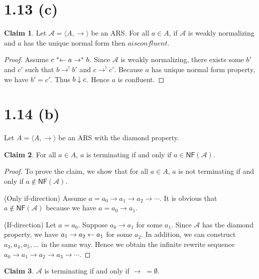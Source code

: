 \documentclass[autodetect-enginem]{article}
\theoremstyle{plain}
\theoremstyle{definition}
\newtheorem*{claim*}{Claim}
\newcommand{\lto}{\reflectbox{$\rightarrow^*$}}
\begin{document}
\section*{1.13 (c)}

\begin{claim*}
    Let $\mathcal{A} = \langle A, \to \rangle$ be an ARS.
    For all $a \in A$, if $\mathcal{A}$ is weakly normalizing and $a$ has the unique normal form then $a is confluent$.
\end{claim*}

\begin{proof}
    Assume $c \;\lto\; a \to^* b$. Since $\mathcal{A}$ is weakly normalizing, there exists some
    $b'$ and $c'$ such that $b \to^! b'$ and $c \to^! c'$.
    Because $a$ has unique normal form property, we have $b' = c'$.
    Thus $b \downarrow c$. Hence $a$ is confluent.    
\end{proof}

\section*{1.14 (b)}
Let $A = \langle A, \to \rangle$ be an ARS with the diamond property.

\begin{claim*}
    For all $a \in A$, $a$ is terminating if and only if $a \in \mathsf{NF}(\mathcal{A})$.
\end{claim*}

\begin{proof}
    To prove the claim, we show that for all $a \in A$, $a$ is not terminating if and only if $a \notin \mathsf{NF}(\mathcal{A})$.

    (Only if-direction) Assume $a = a_0 \to a_1 \to a_2 \to \cdots$.
    It is obvious that $a \notin \mathsf{NF}(\mathcal{A})$ because we have $a = a_0 \to a_1$.
    
    (If-direction) Let $a = a_0$. Suppose $a_0 \to a_1$ for some $a_1$.
    Since $\mathcal{A}$ has the diamond property,
    we have $a_1 \to a_2 \leftarrow a_1$ for some $a_2$. %
    In addition, we can construct $a_3, a_4, a_5, \dots$ in the same way.
    Hence we obtain the infinite rewrite sequence $a_0 \to a_1 \to a_2 \to a_3 \to \cdots$.
\end{proof}

\begin{claim*}
    $\mathcal{A}$ is terminating if and only if $\to \; = \emptyset$.
\end{claim*}
\end{document}
